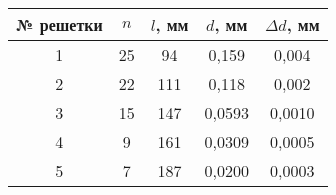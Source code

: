 \begin{tabular}{|c|c|c|c|c|}
\hline
№ решетки&$n$ &$l$, мм&$d$, мм&$\Delta d$, мм\\
\hline
1&25&94&0,159&0,004\\
\hline
2&22&111&0,118&0,002\\
\hline
3&15&147&0,0593&0,0010\\
\hline
4&9&161&0,0309&0,0005\\
\hline
5&7&187&0,0200&0,0003\\
\hline
\end{tabular}